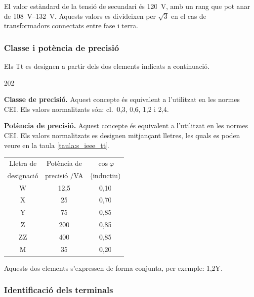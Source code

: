 El valor estàndard de la tensió de
secundari és \qty{120}{V}, amb un rang  que pot anar de \qtyrange{108}{132}{V}. Aquests valors es divideixen per $\sqrt{3}$ en el cas de transformadors connectats entre fase i terra.


\subsubsection{Classe i potència de precisió}

Els Tt es designen a partir dels dos
elements indicats a continuació.

\begin{dingautolist}{202}
    \item \textbf{Classe de precisió.} Aquest concepte és equivalent
    a l'utilitzat en les normes CEI. Els valors
    normalitzats són: cl.~0,3, 0,6, 1,2 i 2,4.

    \item \textbf{Potència de precisió.} Aquest concepte és equivalent
    a l'utilitzat en les normes CEI. Els valors
    normalitzats es designen mitjançant lletres, les quals es poden veure en
    la taula \vref{taula:s_ieee_tt}.

    \begin{center}
        \label{taula:s_ieee_tt}
        \begin{tabular}{ccc}
        \toprule[1pt]
        Lletra de & Potència de & $\cos\varphi$\\
        designació &  precisió /VA &  (inductiu)\\
        \midrule
        W & 12,5 & 0,10\\
        X & 25 & 0,70 \\
        Y & 75 & 0,85 \\
        Z & 200 & 0,85 \\
        ZZ & 400 & 0,85 \\
        M & 35 & 0,20 \\
        \bottomrule[1pt]
        \end{tabular}
    \end{center}
\end{dingautolist}

Aquests dos elements s'expressen de forma conjunta, per exemple:
1,2Y.

\subsubsection{Identificació dels terminals}

